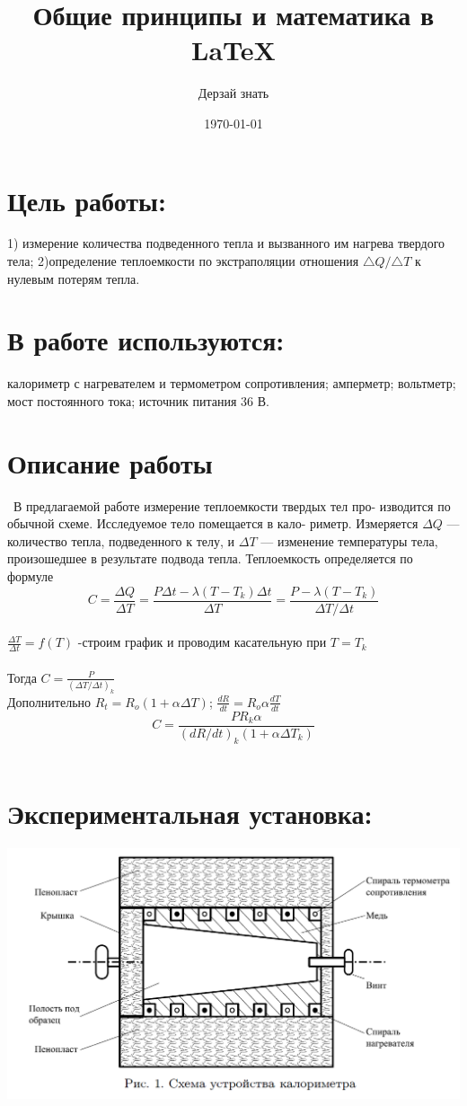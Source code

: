 \documentclass[a4paper,12pt]{article} %
\author{Дерзай знать}
\title{Общие принципы и математика в \LaTeX{}}
\date{\today}
\begin{document}

\maketitle


\newpage
\section{Цель работы:}
1) измерение количества подведенного тепла и вызванного им нагрева твердого тела; 2)определение теплоемкости по экстраполяции отношения  $\triangle Q / \triangle T$ к нулевым потерям тепла.\\
\section{В работе используются:}
 калориметр с нагревателем и термометром сопротивления; амперметр; вольтметр; мост постоянного тока; источник питания 36 В.
 \section*{Описание работы}\
\indent В предлагаемой работе измерение теплоемкости твердых тел про- изводится по обычной схеме. Исследуемое тело помещается в кало- риметр. Измеряется $\Delta Q$ — количество тепла, подведенного к телу, и $\Delta T$ — изменение температуры тела, произошедшее в результате подвода тепла. Теплоемкость определяется по формуле\\
$$C=\frac{\Delta Q}{\Delta T}=\frac{P\Delta t - \lambda (T-T_k)\Delta t}{\Delta T}=\frac{P - \lambda (T-T_k)}{\Delta T/\Delta t}$$
\ \\
$\frac{\Delta T}{\Delta t}=f(T)$ -строим график и проводим касательную при $T=T_k$\\
\ \\
Тогда $C=\frac{P}{(\Delta T/\Delta t)_k}$\\
Дополнительно $R_t=R_o(1+\alpha\Delta T)$; $\frac{dR}{dt}=R_o\alpha\frac{dT}{dt}$\\
$$C=\frac{PR_k\alpha}{(dR/dt)_k(1+\alpha\Delta T_k)}$$
\ \\
\newpage
\section{Экспериментальная установка:}
\includegraphics[scale=0.7]{ust}
\end{document}
